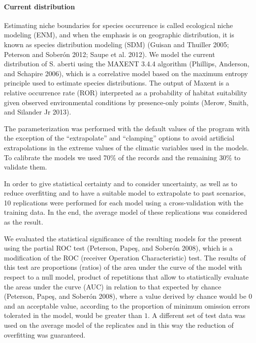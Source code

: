 \documentclass[
]{article}
\begin{document}
\hypertarget{current-distribution}{%
\paragraph{Current distribution}\label{current-distribution}}

Estimating niche boundaries for species occurrence is called ecological
niche modeling (ENM), and when the emphasis is on geographic
distribution, it is known as species distribution modeling (SDM) (Guisan
and Thuiller 2005; Peterson and Soberón 2012; Saupe et al. 2012). We
model the current distribution of S. aberti using the MAXENT 3.4.4
algorithm (Phillips, Anderson, and Schapire 2006), which is a
correlative model based on the maximum entropy principle used to
estimate species distributions. The output of Maxent is a relative
occurrence rate (ROR) interpreted as a probability of habitat
suitability given observed environmental conditions by presence-only
points (Merow, Smith, and Silander Jr 2013).

The parameterization was performed with the default values of the
program with the exception of the ``extrapolate'' and ``clamping''
options to avoid artificial extrapolations in the extreme values of the
climatic variables used in the models. To calibrate the models we used
70\% of the records and the remaining 30\% to validate them.

In order to give statistical certainty and to consider uncertainty, as
well as to reduce overfitting and to have a suitable model to
extrapolate to past scenarios, 10 replications were performed for each
model using a cross-validation with the training data. In the end, the
average model of these replications was considered as the result.

We evaluated the statistical significance of the resulting models for
the present using the partial ROC test (Peterson, Papeş, and Soberón
2008), which is a modification of the ROC (receiver Operation
Characteristic) test. The results of this test are proportions (ratios)
of the area under the curve of the model with respect to a null model,
product of repetitions that allow to statistically evaluate the areas
under the curve (AUC) in relation to that expected by chance (Peterson,
Papeş, and Soberón 2008), where a value derived by chance would be \(0\)
and an acceptable value, according to the proportion of minimum omission
errors tolerated in the model, would be greater than \(1\). A different
set of test data was used on the average model of the replicates and in
this way the reduction of overfitting was guaranteed.
\end{document}
